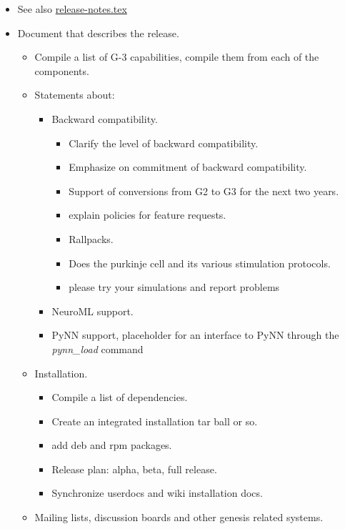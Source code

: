 \documentclass[12pt]{article}
\begin{document}
\begin{itemize}
\item See also \href{../release-notes/release-notes.tex}{release-notes.tex}
\item Document that describes the release.
  \begin{itemize}
  \item Compile a list of G-3 capabilities, compile them from each of the components.
  \item Statements about:
    \begin{itemize}
    \item Backward compatibility.
      \begin{itemize}
      \item Clarify the level of backward compatibility. 
      \item Emphasize on commitment of backward compatibility.
      \item Support of conversions from G2 to G3 for the next two years.
      \item explain policies for feature requests.
      \item Rallpacks.
      \item Does the purkinje cell and its various stimulation protocols.
      \item please try your simulations and report problems
      \end{itemize}
    \item NeuroML support.
    \item PyNN support, placeholder for an interface to PyNN through the
      {\it pynn\_load} command
    \end{itemize}
  \item Installation.
    \begin{itemize}
    \item Compile a list of dependencies.
    \item Create an integrated installation tar ball or so.
    \item add deb and rpm packages.
    \item Release plan: alpha, beta, full release.
    \item Synchronize userdocs and wiki installation docs.
    \end{itemize}
  \item Mailing lists, discussion boards and other genesis related systems.
    \begin{itemize}

\end{itemize}
\end{itemize}
\end{itemize}
\end{document}
